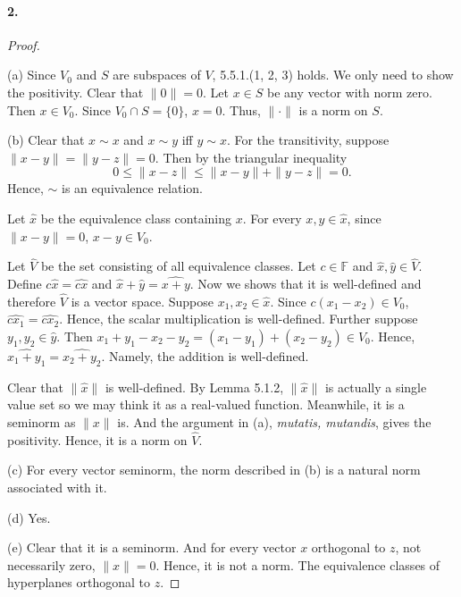   \paragraph{2.}
  \begin{proof}
    $\,$\par
    (a) Since $V_0$ and $S$ are subspaces of $V$, 5.5.1.(1, 2, 3) holds. We only
    need to show the positivity. Clear that $\|0\|=0$. Let $x\in S$ be any
    vector with norm zero. Then $x\in V_0$. Since $V_0\cap S=\{0\}$, $x=0$.
    Thus, $\|\cdot\|$ is a norm on $S$. \par
    (b) Clear that $x\sim x$ and $x\sim y$ iff $y\sim x$. For the transitivity,
    suppose $\|x-y\|=\|y-z\|=0$. Then by the triangular inequality
    \[
      0 \le \|x-z\| \le \|x-y\| + \|y-z\| = 0.
    \]
    Hence, $\sim$ is an equivalence relation.\par
    Let $\hat{x}$ be the equivalence class containing $x$. For every $x,y\in
    \hat{x}$, since $\|x-y\|=0$, $x-y\in V_0$.\par
    Let $\hat{V}$ be the set consisting of all equivalence classes. Let $c
    \in\mathbb{F}$ and $\hat{x},\hat{y}\in\hat{V}$. Define $c\hat{x}=
    \widehat{cx}$ and $\hat{x}+\hat{y}=\widehat{x+y}$. Now we shows that it is
    well-defined and therefore $\hat{V}$ is a vector space. Suppose $x_1,x_2\in
    \hat{x}$. Since $c(x_1-x_2)\in V_0$, $\widehat{cx_1}=\widehat{cx_2}$. Hence,
    the scalar multiplication is well-defined. Further suppose $y_1,y_2\in
    \hat{y}$. Then $x_1+y_1-x_2-y_2 = (x_1-y_1)+(x_2-y_2)\in V_0$. Hence,
    $\widehat{x_1+y_1}=\widehat{x_2+y_2}$. Namely, the addition is well-defined.
    \par
    Clear that $\|\hat{x}\|$ is well-defined. By Lemma 5.1.2, $\|\hat{x}\|$ is 
    actually a single value set so we may think it as a real-valued function.
    Meanwhile, it is a seminorm as $\|x\|$ is. And the argument in (a), \textit{
    mutatis, mutandis}, gives the positivity. Hence, it is a norm on $\hat{V}$.
    \par
    (c) For every vector seminorm, the norm described in (b) is a natural norm 
    associated with it.\par
    (d) Yes.\par
    (e) Clear that it is a seminorm. And for every vector $x$ orthogonal to $z$,
    not necessarily zero, $\|x\|=0$. Hence, it is not a norm. The equivalence
    classes of hyperplanes orthogonal to $z$.
  \end{proof}

